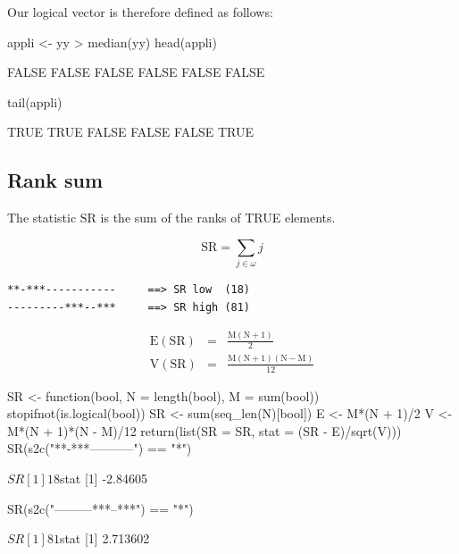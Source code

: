 \documentclass{article}
\begin{document}
Our logical vector is therefore defined as follows:

\begin{Schunk}
\begin{Sinput}
 appli <- yy > median(yy)
 head(appli)
\end{Sinput}
\begin{Soutput}
[1] FALSE FALSE FALSE FALSE FALSE FALSE
\end{Soutput}
\begin{Sinput}
 tail(appli)
\end{Sinput}
\begin{Soutput}
[1]  TRUE  TRUE FALSE FALSE FALSE  TRUE
\end{Soutput}
\end{Schunk}

\subsection{Rank sum}

The statistic $\mathrm{SR}$ is the sum of the ranks of TRUE elements.

$$
\mathrm{SR} = \sum_{j \in \omega}{j}
$$

\begin{verbatim}
**-***-----------     ==> SR low  (18)
---------***--***     ==> SR high (81)
\end{verbatim}

\begin{eqnarray*}
\mathrm{E(SR)} & = & \mathrm{\frac{M(N + 1)}{2}} \\
\mathrm{V(SR)} & = & \mathrm{\frac{M(N + 1)(N - M)}{12}}
\end{eqnarray*}


\begin{Schunk}
\begin{Sinput}
 SR <- function(bool, N = length(bool), M = sum(bool)){
 	stopifnot(is.logical(bool))
 	SR <- sum(seq_len(N)[bool])
 	E <- M*(N + 1)/2
 	V <- M*(N + 1)*(N - M)/12
 	return(list(SR = SR, stat = (SR - E)/sqrt(V)))
 }
 SR(s2c("**-***-----------") == "*")
\end{Sinput}
\begin{Soutput}
$SR
[1] 18

$stat
[1] -2.84605
\end{Soutput}
\begin{Sinput}
 SR(s2c("---------***--***") == "*")
\end{Sinput}
\begin{Soutput}
$SR
[1] 81

$stat
[1] 2.713602
\end{Soutput}
\end{Schunk}
\end{document}
